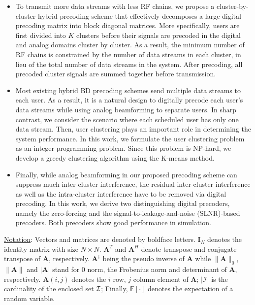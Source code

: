 \documentclass[conference]{IEEEtran}
\begin{document}
\begin{itemize}[leftmargin=*]
\item To transmit more data streams with less RF chains, we propose a cluster-by-cluster hybrid precoding scheme that effectively decomposes a large digital precoding matrix into block diagonal matrices. More specifically, users are first divided into $K$ clusters before their signals are precoded in the digital and analog domains cluster by cluster. As a result, the minimum number of RF chains is constrained by the number of data streams in each cluster, in lieu of the total number of data streams in the system. After precoding, all precoded cluster signals are summed together before transmission.
\item Most existing hybrid BD precoding schemes send multiple data streams to each user. As a result, it is a natural design to digitally precode each user's data streams while using analog beamforming to separate users. In sharp contrast, we consider the scenario where each scheduled user has only one data stream. Then, user clustering plays an important role in determining the system performance. In this work, we formulate the user clustering problem as an integer programming problem. Since this problem is NP-hard, we develop a greedy clustering algorithm using the K-means method.
\item Finally, while analog beamforming in our proposed precoding scheme can suppress much inter-cluster interference, the residual inter-cluster interference as well as the intra-cluster interference have to be removed via digital precoding. In this work, we derive two distinguishing digital precoders, namely the zero-forcing and the signal-to-leakage-and-noise (SLNR)-based precoders. Both precoders show good performance in simulation.
\end{itemize}


\underline{Notation}: Vectors and matrices are denoted by boldface letters. $\bm{I}_N$ denotes the identity matrix with size $N\times N$. ${\bm A}^T$ and ${\bm A}^H$ denote transpose and conjugate transpose of ${\bm A}$, respectively. $\bm{A}^\dagger$ being the pseudo inverse of $\bm{A}$ while $\|\bm{A}\|_0$, $\|\bm{A}\| $ and $|\bm{A}|$ stand for $0$ norm, the Frobenius norm and determinant of ${\bm A}$, respectively. $\bm{A}(i,j)$ denotes the $i$ row, $j$ column element of ${\bm A}$; $|\mathcal{I}|$ is the cardinality of the enclosed set ${\cal I}$; Finally, $\mathbb{E}[\cdot] $ denotes the expectation of a random variable.
\end{document}
